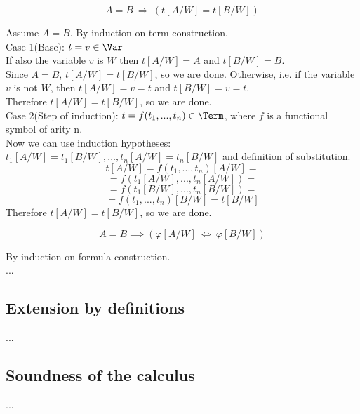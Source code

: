 \begin{theorem}
\[
A=B\ \Longrightarrow\ (t[A/W]=t[B/W])
\]
\end{theorem}
\Proof
Assume $A=B$.
By induction on term construction.\\
Case 1(Base): $t=v\in \Var$\\
If also the variable $v$ is $W$ then $t[A/W]=A$ and $t[B/W]=B$.\\
Since $A=B$, $t[A/W]=t[B/W]$, so we are done.
Otherwise, i.e. if the variable $v$ is not $W$, then $t[A/W]=v=t$ and $t[B/W]=v=t$.\\
Therefore $t[A/W]=t[B/W]$, so we are done.\\
Case 2(Step of induction): $t=f(t_1,...,t_n)\in\Term$, where $f$ is a functional symbol of arity n.\\
Now we can use induction hypotheses: $t_1[A/W]=t_1[B/W],...,t_n[A/W]=t_n[B/W]$ and definition of substitution.
\[
t[A/W]=f(t_1,...,t_n)[A/W]=
\]
\[
=f(t_1[A/W],...,t_n[A/W])=
\]
\[
=f(t_1[B/W],...,t_n[B/W])=
\]
\[
=f(t_1,...,t_n)[B/W]=t[B/W]
\]
Therefore $t[A/W]=t[B/W]$, so we are done.\\
\Done

\begin{theorem}
\[
A=B
\implies
(\varphi[A/W]\ \Longleftrightarrow\ \varphi[B/W])
\]
\end{theorem}
\Proof
By induction on formula construction.\\
...\\
\Done

\subsection{Extension by definitions}
...

\subsection{Soundness of the calculus}
...


\pagebreak

